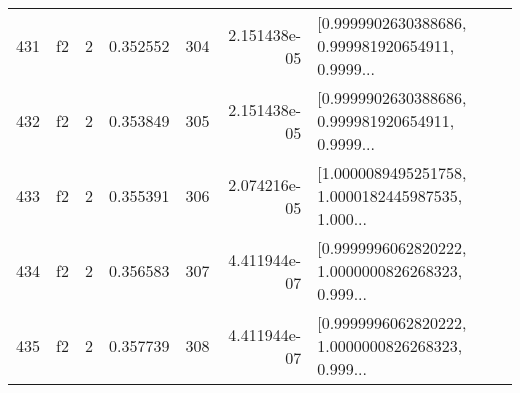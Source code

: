 \begin{tabular}{lllrlrl}
431 &  f2 &   2 &  0.352552 &  304 &  2.151438e-05 &  [0.9999902630388686, 0.999981920654911, 0.9999... \\
432 &  f2 &   2 &  0.353849 &  305 &  2.151438e-05 &  [0.9999902630388686, 0.999981920654911, 0.9999... \\
433 &  f2 &   2 &  0.355391 &  306 &  2.074216e-05 &  [1.0000089495251758, 1.0000182445987535, 1.000... \\
434 &  f2 &   2 &  0.356583 &  307 &  4.411944e-07 &  [0.9999996062820222, 1.0000000826268323, 0.999... \\
435 &  f2 &   2 &  0.357739 &  308 &  4.411944e-07 &  [0.9999996062820222, 1.0000000826268323, 0.999... \\
\bottomrule
\end{tabular}
